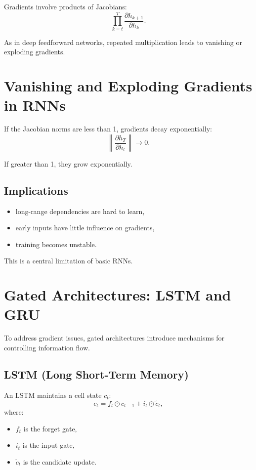 Gradients involve products of Jacobians:
\[
\prod_{k=t}^{T} \frac{\partial h_{k+1}}{\partial h_k}.
\]

As in deep feedforward networks, repeated multiplication leads to vanishing or exploding gradients.

\section{Vanishing and Exploding Gradients in RNNs}

If the Jacobian norms are less than 1, gradients decay exponentially:
\[
\left\| \frac{\partial h_T}{\partial h_t} \right\| \to 0.
\]

If greater than 1, they grow exponentially.

\subsection{Implications}

\begin{itemize}
    \item long-range dependencies are hard to learn,
    \item early inputs have little influence on gradients,
    \item training becomes unstable.
\end{itemize}

This is a central limitation of basic RNNs.

\section{Gated Architectures: LSTM and GRU}

To address gradient issues, gated architectures introduce mechanisms for controlling information flow.

\subsection{LSTM (Long Short-Term Memory)}

An LSTM maintains a cell state $c_t$:
\[
c_t = f_t \odot c_{t-1} + i_t \odot \tilde{c}_t,
\]
where:
\begin{itemize}
    \item $f_t$ is the forget gate,
    \item $i_t$ is the input gate,
    \item $\tilde{c}_t$ is the candidate update.
\end{itemize}

